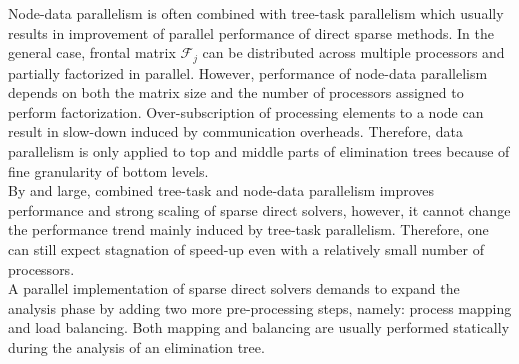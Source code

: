 Node-data parallelism is often combined with tree-task parallelism which usually results in improvement of parallel performance of direct sparse methods. In the general case, frontal matrix $\mathcal{F}_{j}$ can be distributed across multiple processors and partially factorized in parallel. However, performance of node-data parallelism depends on both the matrix size and the number of processors assigned to perform factorization. Over-subscription of processing elements to a node can result in slow-down induced by communication overheads. Therefore,  data parallelism is only applied to top  and middle parts of elimination trees because of fine granularity of bottom levels.\\ 



By and large, combined tree-task and node-data parallelism improves performance and strong scaling of sparse direct solvers, however, it cannot change the performance trend mainly induced by tree-task parallelism. Therefore, one can still expect  stagnation of speed-up even with a relatively small number of processors.\\


A parallel implementation of sparse direct solvers demands to expand the analysis phase by adding 
two more pre-processing steps, namely: process mapping and load balancing. Both mapping and balancing are usually performed statically during the analysis of an elimination tree.\\ %





